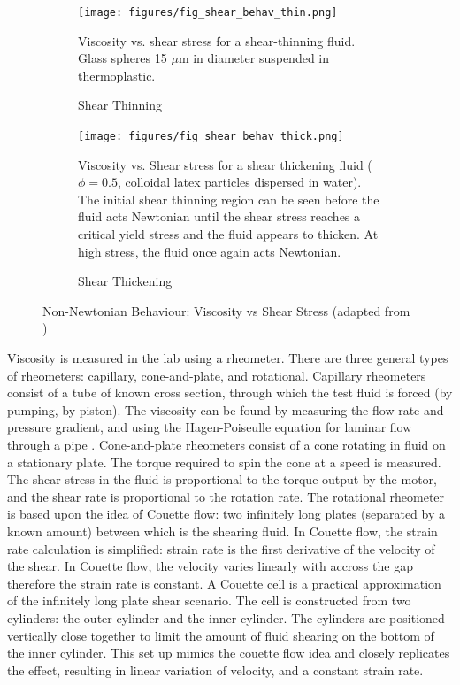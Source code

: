 \documentclass[twoside,a4]{report}
\def\br{\newline \newline \noindent}
\begin{document}
	\begin{figure}[!htb]
		\centering
		\begin{subfigure}[t]{0.45\textwidth}
			\centering
			\texttt{[image: figures/fig\_shear\_behav\_thin.png]}
			\caption{Shear Thinning}
			\label{figshearthin}
			\footnotesize 
			Viscosity vs. shear stress for a shear-thinning fluid. Glass spheres 15 $\mu$m in diameter suspended in thermoplastic.
		\end{subfigure}
		\begin{subfigure}[t]{0.45\textwidth}
			\centering
			\texttt{[image: figures/fig\_shear\_behav\_thick.png]}
			\caption{Shear Thickening}
			\label{figshearthick}
			\footnotesize 
			Viscosity vs. Shear stress for a shear thickening fluid ($\phi=0.5$, colloidal latex particles dispersed in water). The initial shear thinning region can be seen before the fluid acts Newtonian until the shear stress reaches a critical yield stress and the fluid appears to thicken. At high stress, the fluid once again acts Newtonian.
		\end{subfigure}
		\label{figshearthinthick}
		\caption{Non-Newtonian Behaviour: Viscosity vs Shear Stress (adapted from \cite{figshearthin, figshearthick})}
	\end{figure}
	
	\noindent
	Viscosity is measured in the lab using a rheometer. There are three general types of rheometers: capillary, cone-and-plate, and rotational. Capillary rheometers consist of a tube of known cross section, through which the test fluid is forced (by pumping, by piston). The viscosity can be found by measuring the flow rate and pressure gradient, and using the Hagen-Poiseulle equation for laminar flow through a pipe \cite{backcaprheom}. Cone-and-plate rheometers consist of a cone rotating in fluid on a stationary plate. The torque required to spin the cone at a speed is measured. The shear stress in the fluid is proportional to the torque output by the motor, and the shear rate is proportional to the rotation rate. %
	\br
	The rotational rheometer is based upon the idea of Couette flow: two infinitely long plates (separated by a known amount) between which is the shearing fluid. In Couette flow, the strain rate calculation is simplified: strain rate is the first derivative of the velocity of the shear. In Couette flow, the velocity varies linearly with accross the gap therefore the strain rate is constant. A Couette cell is a practical approximation of the infinitely long plate shear scenario. The cell is constructed from two cylinders: the outer cylinder and the inner cylinder. The cylinders are positioned vertically close together to limit the amount of fluid shearing on the bottom of the inner cylinder. This set up mimics the couette flow idea and closely replicates the effect, resulting in linear variation of velocity, and a constant strain rate.
	
\end{document}
